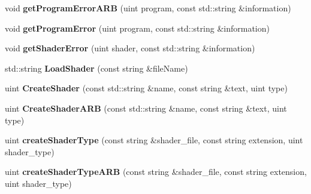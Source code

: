 \begin{DoxyCompactItemize}
\item 
\hypertarget{classEngine_1_1ShaderManager_af80799a6e091b951195979300ef331d3}{}void {\bfseries get\+Program\+Error\+A\+R\+B} (uint program, const std\+::string \&information)\label{classEngine_1_1ShaderManager_af80799a6e091b951195979300ef331d3}

\item 
\hypertarget{classEngine_1_1ShaderManager_ac1ee62e48600af2bf3873f1fa0d4dc0a}{}void {\bfseries get\+Program\+Error} (uint program, const std\+::string \&information)\label{classEngine_1_1ShaderManager_ac1ee62e48600af2bf3873f1fa0d4dc0a}

\item 
\hypertarget{classEngine_1_1ShaderManager_a9f601072a850635d25c33ef0b724c876}{}void {\bfseries get\+Shader\+Error} (uint shader, const std\+::string \&information)\label{classEngine_1_1ShaderManager_a9f601072a850635d25c33ef0b724c876}

\item 
\hypertarget{classEngine_1_1ShaderManager_a1ff6cadd12a4d63624baf15aa4c2ab7f}{}std\+::string {\bfseries Load\+Shader} (const string \&file\+Name)\label{classEngine_1_1ShaderManager_a1ff6cadd12a4d63624baf15aa4c2ab7f}

\item 
\hypertarget{classEngine_1_1ShaderManager_a488ee4fd5e8e12130b0f39ac14b34747}{}uint {\bfseries Create\+Shader} (const std\+::string \&name, const string \&text, uint type)\label{classEngine_1_1ShaderManager_a488ee4fd5e8e12130b0f39ac14b34747}

\item 
\hypertarget{classEngine_1_1ShaderManager_a9eafba65e127c7c0f13135e3a36a9504}{}uint {\bfseries Create\+Shader\+A\+R\+B} (const std\+::string \&name, const string \&text, uint type)\label{classEngine_1_1ShaderManager_a9eafba65e127c7c0f13135e3a36a9504}

\item 
\hypertarget{classEngine_1_1ShaderManager_a907eb8f7b29905794d45747b8e4c5fbe}{}uint {\bfseries create\+Shader\+Type} (const string \&shader\+\_\+file, const string extension, uint shader\+\_\+type)\label{classEngine_1_1ShaderManager_a907eb8f7b29905794d45747b8e4c5fbe}

\item 
\hypertarget{classEngine_1_1ShaderManager_ac3cfdfc83bf97698d70fb51b5b1e0252}{}uint {\bfseries create\+Shader\+Type\+A\+R\+B} (const string \&shader\+\_\+file, const string extension, uint shader\+\_\+type)\label{classEngine_1_1ShaderManager_ac3cfdfc83bf97698d70fb51b5b1e0252}

\end{DoxyCompactItemize}


